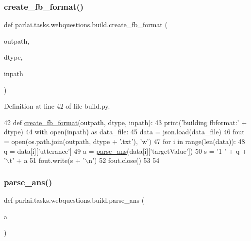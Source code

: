 \subsubsection{\texorpdfstring{create\+\_\+fb\+\_\+format()}{create\_fb\_format()}}
{\footnotesize\ttfamily def parlai.\+tasks.\+webquestions.\+build.\+create\+\_\+fb\+\_\+format (\begin{DoxyParamCaption}\item[{}]{outpath,  }\item[{}]{dtype,  }\item[{}]{inpath }\end{DoxyParamCaption})}



Definition at line 42 of file build.\+py.


\begin{DoxyCode}
42 \textcolor{keyword}{def }\hyperlink{namespaceparlai_1_1tasks_1_1wikiqa_1_1build_a554828702769592403db58c955d1dfe3}{create\_fb\_format}(outpath, dtype, inpath):
43     print(\textcolor{stringliteral}{'building fbformat:'} + dtype)
44     with open(inpath) \textcolor{keyword}{as} data\_file:
45         data = json.load(data\_file)
46     fout = open(os.path.join(outpath, dtype + \textcolor{stringliteral}{'.txt'}), \textcolor{stringliteral}{'w'})
47     \textcolor{keywordflow}{for} i \textcolor{keywordflow}{in} range(len(data)):
48         q = data[i][\textcolor{stringliteral}{'utterance'}]
49         a = \hyperlink{namespaceparlai_1_1tasks_1_1webquestions_1_1build_a969c68eeef096e477def172c88928eb3}{parse\_ans}(data[i][\textcolor{stringliteral}{'targetValue'}])
50         s = \textcolor{stringliteral}{'1 '} + q + \textcolor{stringliteral}{'\(\backslash\)t'} + a
51         fout.write(s + \textcolor{stringliteral}{'\(\backslash\)n'})
52     fout.close()
53 
54 
\end{DoxyCode}
\mbox{\label{namespaceparlai_1_1tasks_1_1webquestions_1_1build_a969c68eeef096e477def172c88928eb3}} 
\subsubsection{\texorpdfstring{parse\+\_\+ans()}{parse\_ans()}}
{\footnotesize\ttfamily def parlai.\+tasks.\+webquestions.\+build.\+parse\+\_\+ans (\begin{DoxyParamCaption}\item[{}]{a }\end{DoxyParamCaption})}



